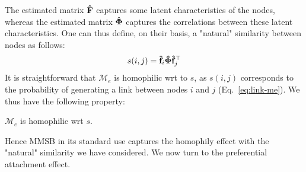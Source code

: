 The estimated matrix $\mathbf{\hat{F}}$ captures some latent characteristics of the nodes, whereas the estimated matrix $\mathbf{\hat{\Phi}}$ captures the correlations between these latent characteristics. One can thus define, on their basis, a "natural" similarity between nodes as follows:
%
\begin{equation}
s(i,j) = \mathbf{\hat{f}}_{i} \mathbf{\hat{\Phi}} \mathbf{\hat{f}}_j^\top \nonumber
\end{equation}
%
It is straightforward that $\mathcal{M}_e$ is homophilic wrt to $s$, as $s(i,j)$ corresponds to the probability of generating a link between nodes $i$ and $j$ (Eq.~\ref{eq:link-me}). We thus have the following property:
%
\begin{proposition}[] $\mathcal{M}_e$ is homophilic wrt $s$.
\end{proposition}
%

Hence MMSB in its standard use captures the homophily effect with the "natural" similarity we have considered. We now turn to the preferential attachment effect.